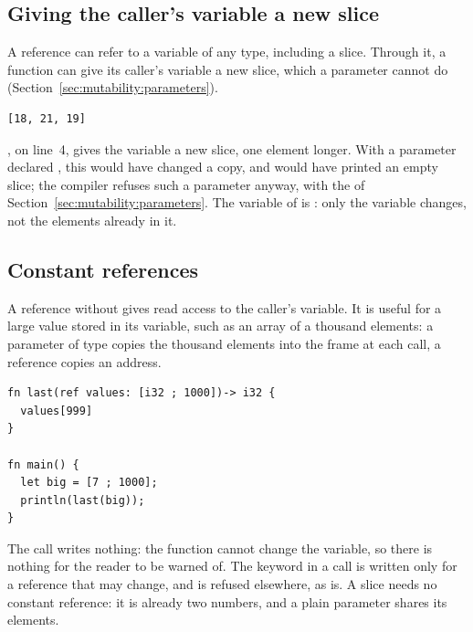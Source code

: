 \subsection{Giving the caller's variable a new slice}

A reference can refer to a variable of any type, including a slice. Through
it, a function can give its caller's variable a new slice, which a
 parameter cannot do (Section~\ref{sec:mutability:parameters}).


\vspace{-10pt}%
\begin{lstlisting}[style=bashVerb]
[18, 21, 19]
\end{lstlisting}

, on line~4, gives the variable a
new slice, one element longer. With a parameter declared , this would have changed a copy, and  would have printed an
empty slice; the compiler refuses such a parameter anyway, with the
 of Section~\ref{sec:mutability:parameters}. The
variable of  is : only the variable changes, not the
elements already in it.

\subsection{Constant references}

A reference without  gives read access to the caller's variable. It
is useful for a large value stored in its variable, such as an array of a
thousand elements: a parameter of type \token{[i32 ; 1000]} copies the thousand
elements into the frame at each call, a reference copies an address.

\begin{lstlisting}[style=coloredverbatim]
fn last(ref values: [i32 ; 1000])-> i32 {
  values[999]
}

fn main() {
  let big = [7 ; 1000];
  println(last(big));
}
\end{lstlisting}

The call writes nothing: the function cannot change the variable, so there is
nothing for the reader to be warned of. The  keyword in a call is
written only for a reference that may change, and is refused elsewhere, as
 is. A slice needs no constant reference: it is already two
numbers, and a plain parameter shares its elements.

